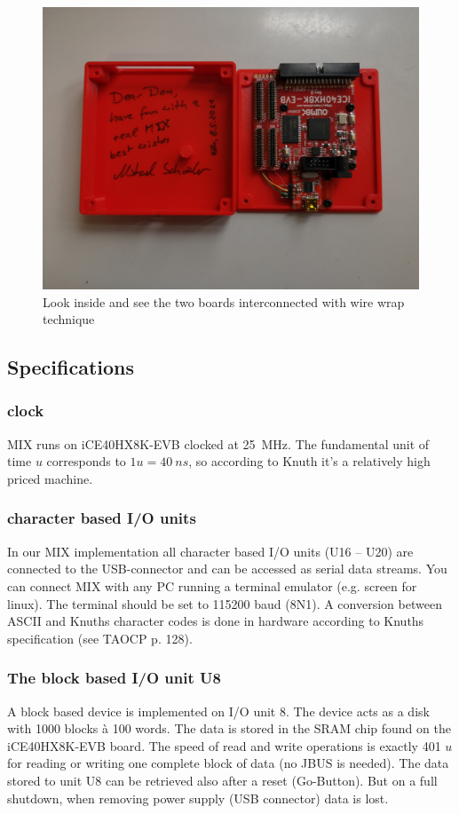\documentclass[a4paper,ngerman]{scrartcl}
\begin{document}
\begin{figure}[H]
	\centering
	\includegraphics[width=0.7\linewidth]{../MIX_don.jpg}
	\caption{Look inside and see the two boards interconnected with wire wrap technique}
	\label{fig:mixinside}
\end{figure}


\subsection{Specifications}

\subsubsection{clock}
MIX runs on iCE40HX8K-EVB clocked at \SI{25}{MHz}. The fundamental unit of time $u$ corresponds to $1u = \SI{40}{ns}$, so according to Knuth it's a relatively high priced machine.

\subsubsection{character based I/O units}
In our MIX implementation all character based I/O units (U16 -- U20) are connected to the USB-connector and can be accessed as serial data streams. You can connect MIX with any PC running a terminal emulator (e.g. screen for linux). The terminal should be set to 115200 baud (8N1). A conversion between ASCII and Knuths character codes is done in hardware according to Knuths specification (see TAOCP p. 128).

\subsubsection{The block based I/O unit U8}
A block based device is implemented on I/O unit 8. The device acts as a disk with 1000 blocks à 100 words. The data is stored in the SRAM chip found on the iCE40HX8K-EVB board. The speed of read and write operations is exactly 401 $u$ for reading or writing one complete block of data (no JBUS is needed). The data stored to unit U8 can be retrieved also after a reset (Go-Button). But on a full shutdown, when removing power supply (USB connector) data is lost.
\end{document}
